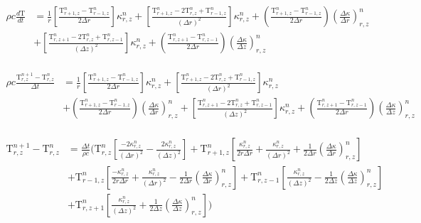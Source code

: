 \documentclass[12pt]{article}
\begin{document}
		\begin{equation}
		\begin{aligned}
		\rho c \frac{d\mathrm{T}}{dt} &= \frac{1}{r} \left [\frac{\mathrm{T}^{n}_{r + 1, z} - \mathrm{T}^{n}_{r - 1, z}}{2\Delta r}  \right ]\kappa^{n}_{r, z} + \left [\frac{\mathrm{T}^{n}_{r + 1, z}  - 2 \mathrm{T}^{n}_{r, z} +  \mathrm{T}^{n}_{r - 1, z}}{(\Delta r)^2} \right ]  \kappa^{n}_{r, z} + (\frac{\mathrm{T}^{n}_{r + 1, z} - \mathrm{T}^{n}_{r - 1, z}}{2\Delta r}) (\frac{\Delta \kappa}{\Delta r})^n_{r, z} \\
		&+ \left [\frac{\mathrm{T}^{n}_{r, z + 1}  - 2 \mathrm{T}^{n}_{r, z} +  \mathrm{T}^{n}_{r, z -1}}{(\Delta z)^2} \right ]\kappa^n_{r, z} + (\frac{\mathrm{T}^{n}_{r, z + 1} - \mathrm{T}^{n}_{r, z - 1}}{2\Delta r})(\frac{\Delta \kappa}{\Delta z})^n_{r, z} \\
		\end{aligned}
		\end{equation}
		
		\begin{equation}
		\begin{aligned}
		\rho c \frac{\mathrm{T}^{n+1}_{r, z} - \mathrm{T}^{n}_{r, z}}{\Delta t} &= \frac{1}{r} \left [\frac{\mathrm{T}^{n}_{r + 1, z} - \mathrm{T}^{n}_{r - 1, z}}{2\Delta r}  \right ]\kappa^{n}_{r, z} + \left [\frac{\mathrm{T}^{n}_{r + 1, z}  - 2 \mathrm{T}^{n}_{r, z} +  \mathrm{T}^{n}_{r - 1, z}}{(\Delta r)^2} \right ]  \kappa^{n}_{r, z}  \\
		&+ (\frac{\mathrm{T}^{n}_{r + 1, z} - \mathrm{T}^{n}_{r - 1, z}}{2\Delta r}) (\frac{\Delta \kappa}{\Delta r})^n_{r, z}  + \left [\frac{\mathrm{T}^{n}_{r, z + 1}  - 2 \mathrm{T}^{n}_{r, z} +  \mathrm{T}^{n}_{r, z -1}}{(\Delta z)^2} \right ]\kappa^n_{r, z} + (\frac{\mathrm{T}^{n}_{r, z + 1} - \mathrm{T}^{n}_{r, z - 1}}{2\Delta r})(\frac{\Delta \kappa}{\Delta z})^n_{r, z} \\
		\end{aligned}
		\end{equation}
		
		\begin{equation}
		\begin{aligned}
		\mathrm{T}^{n+1}_{r, z} - \mathrm{T}^{n}_{r, z} &= \frac{\Delta t}{\rho c}(\mathrm{T}^{n}_{r, z} \left [\frac{-2\kappa^n_{r, z}}{(\Delta r)^2} -\frac{2\kappa^n_{r, z}}{(\Delta z)^2}  \right ] + \mathrm{T}^{n}_{r + 1, z} \left [\frac{\kappa^n_{r, z}}{2r\Delta r} + \frac{\kappa^n_{r, z}}{(\Delta r)^2} + \frac{1}{2\Delta r}(\frac{\Delta\kappa}{\Delta r})^n_{r, z} \right ] \\
		&+ \mathrm{T}^{n}_{r - 1, z} \left [\frac{-\kappa^n_{r, z}}{2r\Delta r} + \frac{\kappa^n_{r, z}}{(\Delta r)^2} - \frac{1}{2\Delta r}(\frac{\Delta\kappa}{\Delta r})^n_{r, z} \right ] + \mathrm{T}^{n}_{r, z - 1} \left [\frac{\kappa^n_{r, z}}{(\Delta z)^2} - \frac{1}{2\Delta z}(\frac{\Delta\kappa}{\Delta z})^n_{r, z}  \right ] \\
		&+ \mathrm{T}^{n}_{r, z + 1} \left [ \frac{\kappa^n_{r, z}}{(\Delta z)^2} + \frac{1}{2\Delta z}(\frac{\Delta\kappa}{\Delta z})^n_{r, z} \right ]) \\
		\end{aligned}
		\end{equation}
		
\end{document}
